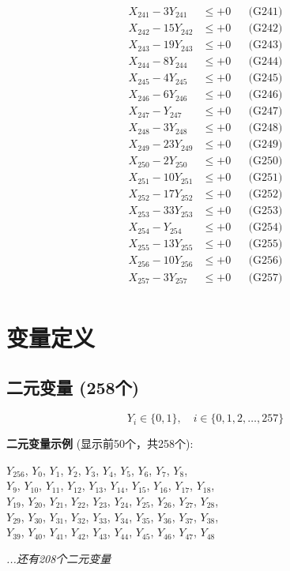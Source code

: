 \documentclass[a4paper,10pt]{article}
\begin{document}
{\begin{align}
X_{241} - 3Y_{241} &\leq +0 && \text{(G241)} \\
X_{242} - 15Y_{242} &\leq +0 && \text{(G242)} \\
X_{243} - 19Y_{243} &\leq +0 && \text{(G243)} \\
\allowbreak
X_{244} - 8Y_{244} &\leq +0 && \text{(G244)} \\
X_{245} - 4Y_{245} &\leq +0 && \text{(G245)} \\
X_{246} - 6Y_{246} &\leq +0 && \text{(G246)} \\
X_{247} - Y_{247} &\leq +0 && \text{(G247)} \\
X_{248} - 3Y_{248} &\leq +0 && \text{(G248)} \\
X_{249} - 23Y_{249} &\leq +0 && \text{(G249)} \\
X_{250} - 2Y_{250} &\leq +0 && \text{(G250)} \\
X_{251} - 10Y_{251} &\leq +0 && \text{(G251)} \\
X_{252} - 17Y_{252} &\leq +0 && \text{(G252)} \\
X_{253} - 33Y_{253} &\leq +0 && \text{(G253)} \\
\allowbreak
X_{254} - Y_{254} &\leq +0 && \text{(G254)} \\
X_{255} - 13Y_{255} &\leq +0 && \text{(G255)} \\
X_{256} - 10Y_{256} &\leq +0 && \text{(G256)} \\
X_{257} - 3Y_{257} &\leq +0 && \text{(G257)} \\
\end{align}
}

\section{变量定义}

\subsection{二元变量 (258个)}

\begin{equation}
Y_i \in \{0,1\}, \quad i \in \{0, 1, 2, \ldots, 257\}
\end{equation}

\textbf{二元变量示例} (显示前50个，共258个):

{\small
$Y_{256}$, $Y_{0}$, $Y_{1}$, $Y_{2}$, $Y_{3}$, $Y_{4}$, $Y_{5}$, $Y_{6}$, $Y_{7}$, $Y_{8}$, \\
$Y_{9}$, $Y_{10}$, $Y_{11}$, $Y_{12}$, $Y_{13}$, $Y_{14}$, $Y_{15}$, $Y_{16}$, $Y_{17}$, $Y_{18}$, \\
$Y_{19}$, $Y_{20}$, $Y_{21}$, $Y_{22}$, $Y_{23}$, $Y_{24}$, $Y_{25}$, $Y_{26}$, $Y_{27}$, $Y_{28}$, \\
$Y_{29}$, $Y_{30}$, $Y_{31}$, $Y_{32}$, $Y_{33}$, $Y_{34}$, $Y_{35}$, $Y_{36}$, $Y_{37}$, $Y_{38}$, \\
$Y_{39}$, $Y_{40}$, $Y_{41}$, $Y_{42}$, $Y_{43}$, $Y_{44}$, $Y_{45}$, $Y_{46}$, $Y_{47}$, $Y_{48}$

\textit{...还有208个二元变量}
}
\end{document}
